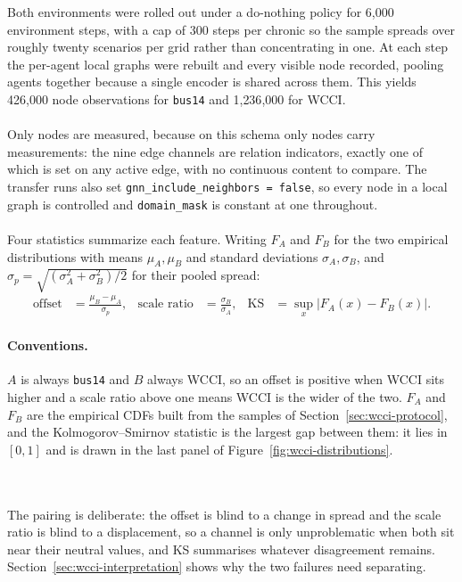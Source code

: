 Both environments were rolled out under a do-nothing policy for 6{,}000
environment steps, with a cap of 300 steps per chronic so the sample spreads
over roughly twenty scenarios per grid rather than concentrating in one. At each
step the per-agent local graphs were rebuilt and every visible node recorded,
pooling agents together because a single encoder is shared across them. This
yields 426{,}000 node observations for \texttt{bus14} and 1{,}236{,}000 for
WCCI.
\\
\\
Only nodes are measured, because on this schema only nodes carry measurements:
the nine edge channels are relation indicators, exactly one of which is set on
any active edge, with no continuous content to compare. The transfer runs also
set \texttt{gnn\_include\_neighbors = false}, so every node in a local graph is
controlled and \texttt{domain\_mask} is constant at one throughout.
\\
\\
Four statistics summarize each feature. Writing $F_A$ and $F_B$ for the two
empirical distributions with means $\mu_A,\mu_B$ and standard deviations
$\sigma_A,\sigma_B$, and $\sigma_p=\sqrt{(\sigma_A^2+\sigma_B^2)/2}$ for their
pooled spread:
\begin{align}
  \text{offset} &= \frac{\mu_B-\mu_A}{\sigma_p},
  &\text{scale ratio} &= \frac{\sigma_B}{\sigma_A},
  &\mathrm{KS} &= \sup_x |F_A(x)-F_B(x)| . \label{eq:offset-scale}
\end{align}
{\color{clarif}
\paragraph{Conventions.} $A$ is always \texttt{bus14} and $B$ always WCCI, so an
offset is positive when WCCI sits higher and a scale ratio above one means WCCI
is the wider of the two. $F_A$ and $F_B$ are the empirical CDFs built from the
samples of Section~\ref{sec:wcci-protocol}, and the Kolmogorov--Smirnov
statistic is the largest gap between them: it lies in $[0,1]$ and is drawn in
the last panel of Figure~\ref{fig:wcci-distributions}.}
\\
\\
The pairing is deliberate: the offset is blind to a change in spread and the
scale ratio is blind to a displacement, so a channel is only unproblematic when
both sit near their neutral values, and KS summarises whatever disagreement
remains. Section~\ref{sec:wcci-interpretation} shows why the two failures need
separating.


